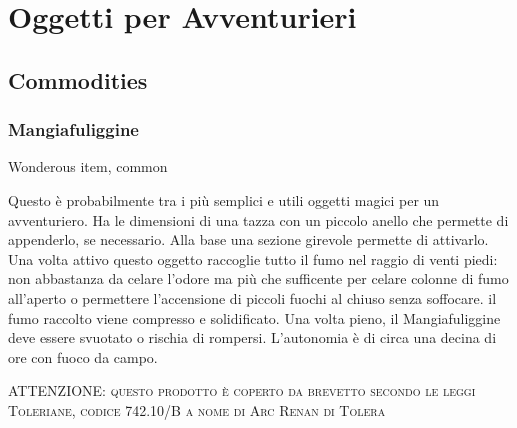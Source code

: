 \section{Oggetti per Avventurieri}
\subsection{Commodities}
\subsubsection{Mangiafuliggine}
{Wonderous item, common}

Questo è probabilmente tra i più semplici e utili oggetti magici per un avventuriero. Ha le dimensioni di una tazza con un piccolo anello che permette di appenderlo, se necessario. Alla base una sezione girevole permette di attivarlo. Una volta attivo questo oggetto raccoglie tutto il fumo nel raggio di venti piedi: non abbastanza da celare l'odore ma più che sufficente per celare colonne di fumo all'aperto o permettere l'accensione di piccoli fuochi al chiuso senza soffocare.
il fumo raccolto viene compresso e solidificato. Una volta pieno, il Mangiafuliggine deve essere svuotato o rischia di rompersi. L'autonomia è di circa una decina di ore con fuoco da campo.

\textsc{ATTENZIONE: questo prodotto è coperto da brevetto secondo le leggi Toleriane, codice 742.10/B a nome di Arc Renan di Tolera}
